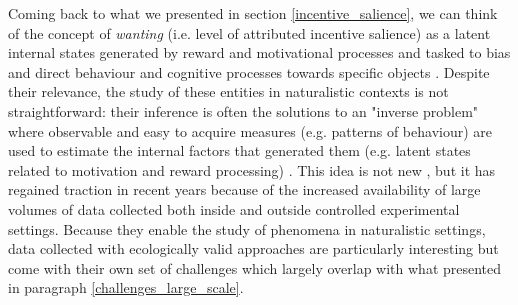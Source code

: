Coming back to what we presented in section \ref{incentive_salience}, we can think of the concept of \textit{wanting} (i.e. level of attributed incentive salience) as a latent internal states generated by reward and motivational processes and tasked to bias and direct behaviour and cognitive processes towards specific objects \cite{berridge2008affective}. Despite their relevance, the study of these entities in naturalistic contexts is not straightforward: their inference is often the solutions to an "inverse problem" \cite{bishop2006pattern} where observable and easy to acquire measures (e.g. patterns of behaviour) are used to estimate the internal factors that generated them (e.g. latent states related to motivation and reward processing) \cite{song2017reward,wang2018prefrontal}. This idea is not new \cite{spearman1961general}, but it has regained traction in recent years because of the increased availability of large volumes of data collected both inside and outside controlled experimental settings. Because they enable the study of phenomena in naturalistic settings, data collected with ecologically valid approaches are particularly interesting but come with their own set of challenges \cite{hashem2015rise} which largely overlap with what presented in paragraph \ref{challenges_large_scale}. 

